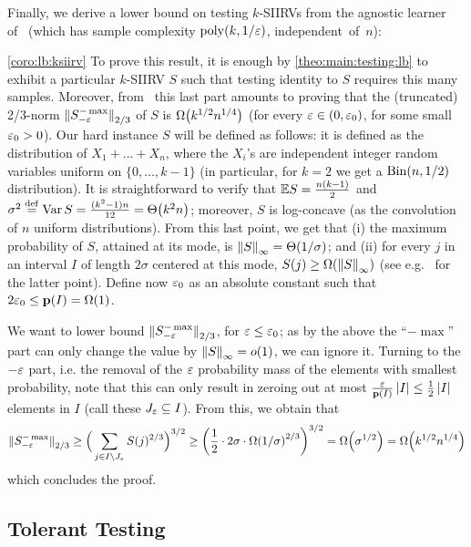 \noindent Finally, we derive a lower bound on testing $k$-SIIRVs from the agnostic learner of~\cite{DDOST:13} (which has sample complexity $\operatorname*{poly}(k,1/\varepsilon)$, independent~of~$n$):
\corolbksiirv*
\begin{proofof}{\cref{coro:lb:ksiirv}}
To prove this result, it is enough by \cref{theo:main:testing:lb} to exhibit a particular $k$-SIIRV $S$ such that testing identity to $S$ requires this many samples. Moreover, from~\cite{VV:14} this last part amounts to proving that the (truncated) 2/3-norm $\lVert S^{-\max}_{-\varepsilon}{\rVert}_{2/3}$ of $S$ is $\bigOmega{k^{1/2}n^{1/4}}$ (for every $\varepsilon\in(0,\varepsilon_0)$, for some small $\varepsilon_0>0$). Our hard instance $S$ will be defined as follows: it is defined as the distribution of $X_1+\dots+X_n$, where the $X_i$'s are independent integer random variables uniform on $\{0,\dots,k-1\}$ (in particular, for $k=2$ we get a $\operatorname{Bin}\!\left( n, 1/2 \right)$ distribution). It is straightforward to verify that $\mathbb{E}{S} = \frac{n(k-1)}{2}$ and $\sigma^2\eqdef\var S = \frac{(k^2-1)n}{12} = \bigTheta{k^2 n}$; moreover, $S$ is log-concave (as the convolution of $n$ uniform distributions). From this last point, we get that \textsf{(i)} the maximum probability of $S$, attained at its mode, is $\norminf{S}=\bigTheta{1/\sigma}$; and \textsf{(ii)} for every $j$ in an interval $I$ of length $2\sigma$ centered at this mode, $S(j) \geq \bigOmega{\norminf{S}}$ (see e.g.~\cite[Lemma 5.7]{DKS:15:arXiv} for the latter point). Define now $\varepsilon_0$ as an absolute constant such that  $2\eps_0 \leq \D(I) = \bigOmega{1}$.

We want to lower bound $\lVert S^{-\max}_{-\varepsilon}{\rVert}_{2/3}$, for $\varepsilon\leq \varepsilon_0$; as by the above the ``$-\max$'' part can only change the value by ${\lVert S{\rVert}}_\infty=o(1)$, we can ignore it. Turning to the $-\varepsilon$ part, i.e. the removal of the $\varepsilon$ probability mass of the elements with smallest probability, note that this can only result in zeroing out at most $\frac{\varepsilon}{\mathbf{p}(I)}\left\lvert I \right\rvert\leq \frac{1}{2}\left\lvert I \right\rvert$ elements in $I$ (call these $J_\varepsilon\subseteq I$). From this, we obtain that
\[
    \norm{S^{-\max}_{-\eps}}_{2/3}\geq \Big(\sum_{j\in I\setminus J_\eps} S(j)^{2/3}\Big)^{3/2} \geq \mleft(\frac{1}{2}\cdot 2\sigma\cdot \bigOmega{1/\sigma}^{2/3}\mright)^{3/2} =\bigOmega{\sigma^{1/2}} = \bigOmega{k^{1/2}n^{1/4}}
\]
which concludes the proof.
\end{proofof}

\subsection{Tolerant Testing}\label{sec:lowerbounds:tol}

